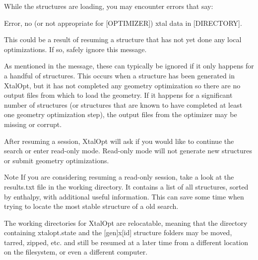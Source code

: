 While the structures are loading, you may encounter errors that say\+:

\begin{DoxyVerb}Error, no (or not appropriate for [OPTIMIZER]) xtal data in [DIRECTORY].

This could be a result of resuming a structure that has not yet done
any local optimizations. If so, safely ignore this message.
\end{DoxyVerb}


As mentioned in the message, these can typically be ignored if it only happens for a handful of structures. This occurs when a structure has been generated in Xtal\+Opt, but it has not completed any geometry optimization so there are no output files from which to load the geometry. If it happens for a significant number of structures (or structures that are known to have completed at least one geometry optimization step), the output files from the optimizer may be missing or corrupt.

After resuming a session, Xtal\+Opt will ask if you would like to continue the search or enter read-\/only mode. Read-\/only mode will not generate new structures or submit geometry optimizations.

\begin{DoxyNote}{Note}
If you are considering resuming a read-\/only session, take a look at the results.\+txt file in the working directory. It contains a list of all structures, sorted by enthalpy, with additional useful information. This can save some time when trying to locate the most stable structure of a old search.
\end{DoxyNote}
The working directories for Xtal\+Opt are relocatable, meaning that the directory containing xtalopt.\+state and the \mbox{[}gen\mbox{]}x\mbox{[}id\mbox{]} structure folders may be moved, tarred, zipped, etc. and still be resumed at a later time from a different location on the filesystem, or even a different computer. 
